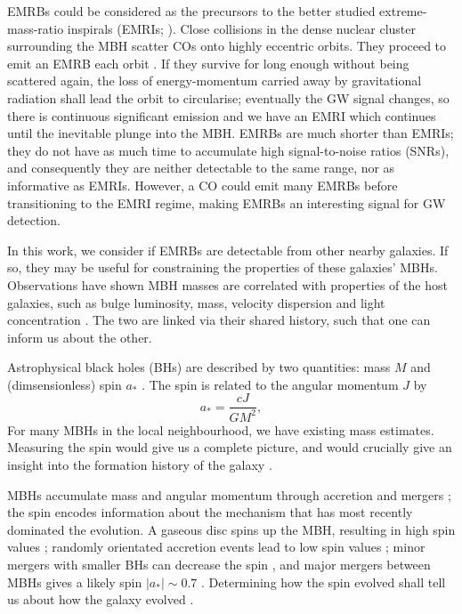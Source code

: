 \documentclass[useAMS,usedcolumn,usegraphicx,usenatbib]{mn2e}
\begin{document}
EMRBs could be considered as the precursors to the better studied extreme-mass-ratio inspirals (EMRIs; \citealt{Amaro-Seoane2007}). Close collisions in the dense nuclear cluster surrounding the MBH scatter COs onto highly eccentric orbits. They proceed to emit an EMRB each orbit \citep*{Rubbo2006}. If they survive for long enough without being scattered again, the loss of energy-momentum carried away by gravitational radiation shall lead the orbit to circularise; eventually the GW signal changes, so there is continuous significant emission and we have an EMRI which continues until the inevitable plunge into the MBH. EMRBs are much shorter than EMRIs; they do not have as much time to accumulate high signal-to-noise ratios (SNRs), and consequently they are neither detectable to the same range, nor as informative as EMRIs. However, a CO could emit many EMRBs before transitioning to the EMRI regime, making EMRBs an interesting signal for GW detection.

In this work, we consider if EMRBs are detectable from other nearby galaxies. If so, they may be useful for constraining the properties of these galaxies' MBHs. Observations have shown MBH masses are correlated with properties of the host galaxies, such as bulge luminosity, mass, velocity dispersion and light concentration \citep[e.g.][]{Kormendy1995, Magorrian1998, Graham2011}. The two are linked via their shared history, such that one can inform us about the other.

Astrophysical black holes (BHs) are described by two quantities: mass $M$ and (dimsensionless) spin $a_\ast$ \citep{Chandrasekhar1998}. The spin is related to the angular momentum $J$ by
\begin{equation}
a_\ast = \frac{cJ}{GM^2},
\end{equation}
For many MBHs in the local neighbourhood, we have existing mass estimates. Measuring the spin would give us a complete picture, and would crucially give an insight into the formation history of the galaxy \citep{Dotti2012,Volonteri2012a}.

MBHs accumulate mass and angular momentum through accretion and mergers \citep{Volonteri2010, Yu2002}; the spin encodes information about the mechanism that has most recently dominated the evolution. A gaseous disc spins up the MBH, resulting in high spin values \citep{Volonteri2005}; randomly orientated accretion events lead to low spin values \citep*{King2006, King2008}; minor mergers with smaller BHs can decrease the spin \citep*{Hughes2003, Gammie2004}, and major mergers between MBHs gives a likely spin $|a_\ast| \sim 0.7$ \citep{Berti2008, Gonzalez2007}. Determining how the spin evolved shall tell us about how the galaxy evolved \citep{Barausse2012}.
\end{document}
